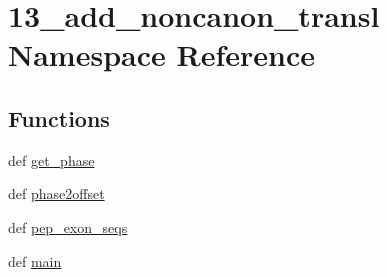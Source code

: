 \hypertarget{namespace13__add__noncanon__transl}{\section{13\-\_\-add\-\_\-noncanon\-\_\-transl Namespace Reference}
\label{namespace13__add__noncanon__transl}
}
\subsection*{Functions}
\begin{DoxyCompactItemize}
\item 
def \hyperlink{namespace13__add__noncanon__transl_a3af2a028e6eb8577a6d22b57ebc883b6}{get\-\_\-phase}
\item 
def \hyperlink{namespace13__add__noncanon__transl_a46049f89993a4844046f924c0efb5e5e}{phase2offset}
\item 
def \hyperlink{namespace13__add__noncanon__transl_a112a64de0605bdb5b9c761fd88f49a02}{pep\-\_\-exon\-\_\-seqs}
\item 
def \hyperlink{namespace13__add__noncanon__transl_a371617fe87e3fc3d046102991322bed3}{main}
\end{DoxyCompactItemize}


